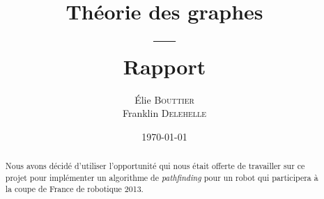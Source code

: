 \documentclass[a4paper,11pt]{article}
\title{Théorie des graphes \\ --- \\ Rapport}
\author{Élie \textsc{Bouttier} \\ Franklin \textsc{Delehelle}}
\date\today
\begin{document}
\maketitle





\begin{abstract}
Nous avons décidé d'utiliser l'opportunité qui nous était offerte de travailler
sur ce projet pour implémenter 
un algorithme de \emph{pathfinding} pour un robot qui participera à la coupe de
France de robotique 2013.
\end{abstract}
\end{document}
